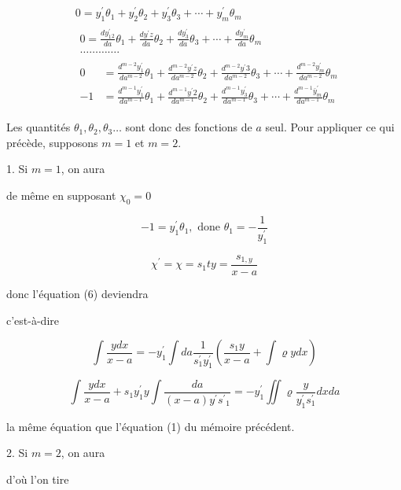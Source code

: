 \documentclass{article}
\begin{document}
\[
\begin{aligned}
& 0=y_{1}^{\prime} \theta_{1}+y_{2}^{\prime} \theta_{2}+y_{3}^{\prime} \theta_{3}+\cdots+y_{m}^{\prime} \theta_{m} \\
& \begin{array}{l}
0=\frac{d y_{1}^{\prime}{ }_{2}}{d a} \theta_{1}+\frac{d y^{\prime} z}{d a} \theta_{2}+\frac{d y_{3}^{\prime}}{d a} \theta_{3}+\cdots+\frac{d y_{m}^{\prime}}{d a} \theta_{m} \\
\ldots \ldots \ldots \ldots .
\end{array} \\
& \begin{aligned}
0 & =\frac{d^{m-2} y_{1}^{\prime}}{d a^{m-2}} \theta_{1}+\frac{d^{m-2} y^{\prime} z}{d a^{m-2}} \theta_{2}+\frac{d^{m-2} y^{\prime} 3}{d a^{m-2}} \theta_{3}+\cdots+\frac{d^{m-2} y_{m}^{\prime}}{d a^{m-2}} \theta_{m} \\
-1 & =\frac{d^{m-1} y_{1}^{\prime}}{d a^{m-1}} \theta_{1}+\frac{d^{m-1} y^{\prime} 2}{d a^{m-1}} \theta_{2}+\frac{d^{m-1} y_{3}^{\prime}}{d a^{m-1}} \theta_{3}+\cdots+\frac{d^{m-1} \bar{y}_{m}^{\prime}}{d a^{m-1}} \theta_{m}
\end{aligned}
\end{aligned}
\]

Les quantités \(\theta_{1}, \theta_{2}, \theta_{3} \ldots\) sont donc des fonctions de \(a\) seul. Pour appliquer ce qui précède, supposons \(m=1\) et \(m=2\).

1. Si \(m=1\), on aura

de même en supposant \(\chi_{0}=0\)

\[
-1=y_{1}^{\prime} \theta_{1}, \text { done } \theta_{1}=-\frac{1}{y_{1}^{\prime}}
\]

\[
\chi^{\prime}=\chi=s_{1} t y=\frac{s_{1, y}}{x-a}
\]

donc l'équation (6) deviendra

c'est-à-dire

\[
\int \frac{y d x}{x-a}=-y_{1}^{\prime} \int d a \frac{1}{s_{1}^{\prime} y_{1}^{\prime}}\left(\frac{s_{1} y}{x-a}+\int \varrho y d x\right)
\]

\[
\int \frac{y d x}{x-a}+s_{1} y_{1}^{\prime} y \int \frac{d a}{(x-a) y^{\prime} s^{\prime}{ }_{1}}=-y_{1}^{\prime} \iint \varrho \frac{y}{y_{1}^{\prime} s_{1}^{\prime}} d x d a
\]

la même équation que l'équation (1) du mémoire précédent.

2. Si \(m=2\), on aura

d'où l'on tire
\end{document}
